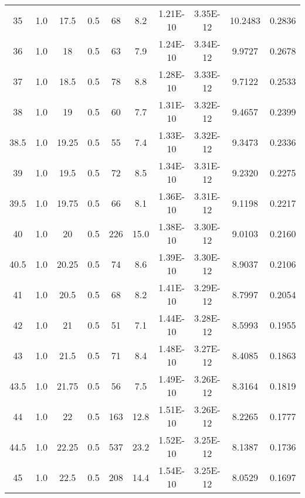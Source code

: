 \begin{maintable}[ht]
\begin{tabular}{cccccccccc}
35        & 1.0 & 17.5     & 0.5         & 68    & 8.2      & 1.21E-10      & 3.35E-12         & 10.2483      & 0.2836 \\
36        & 1.0 & 18       & 0.5         & 63    & 7.9      & 1.24E-10      & 3.34E-12         & 9.9727       & 0.2678 \\
37        & 1.0 & 18.5     & 0.5         & 78    & 8.8      & 1.28E-10      & 3.33E-12         & 9.7122       & 0.2533 \\
38        & 1.0 & 19       & 0.5         & 60    & 7.7      & 1.31E-10      & 3.32E-12         & 9.4657       & 0.2399 \\
38.5        & 1.0 & 19.25    & 0.5         & 55    & 7.4      & 1.33E-10      & 3.32E-12         & 9.3473       & 0.2336 \\
39        & 1.0 & 19.5     & 0.5         & 72    & 8.5      & 1.34E-10      & 3.31E-12         & 9.2320       & 0.2275 \\
39.5        & 1.0 & 19.75    & 0.5         & 66    & 8.1      & 1.36E-10      & 3.31E-12         & 9.1198       & 0.2217 \\
40        & 1.0 & 20       & 0.5         & 226   & 15.0     & 1.38E-10      & 3.30E-12         & 9.0103       & 0.2160 \\
40.5        & 1.0 & 20.25    & 0.5         & 74    & 8.6      & 1.39E-10      & 3.30E-12         & 8.9037       & 0.2106 \\
41        & 1.0 & 20.5     & 0.5         & 68    & 8.2      & 1.41E-10      & 3.29E-12         & 8.7997       & 0.2054 \\
42        & 1.0 & 21       & 0.5         & 51    & 7.1      & 1.44E-10      & 3.28E-12         & 8.5993       & 0.1955 \\
43        & 1.0 & 21.5     & 0.5         & 71    & 8.4      & 1.48E-10      & 3.27E-12         & 8.4085       & 0.1863 \\
43.5        & 1.0 & 21.75    & 0.5         & 56    & 7.5      & 1.49E-10      & 3.26E-12         & 8.3164       & 0.1819 \\
44        & 1.0 & 22       & 0.5         & 163   & 12.8     & 1.51E-10      & 3.26E-12         & 8.2265       & 0.1777 \\
44.5        & 1.0 & 22.25    & 0.5         & 537   & 23.2     & 1.52E-10      & 3.25E-12         & 8.1387       & 0.1736 \\
45        & 1.0 & 22.5     & 0.5         & 208   & 14.4     & 1.54E-10      & 3.25E-12         & 8.0529       & 0.1697 \\

\end{tabular}
\end{maintable}
